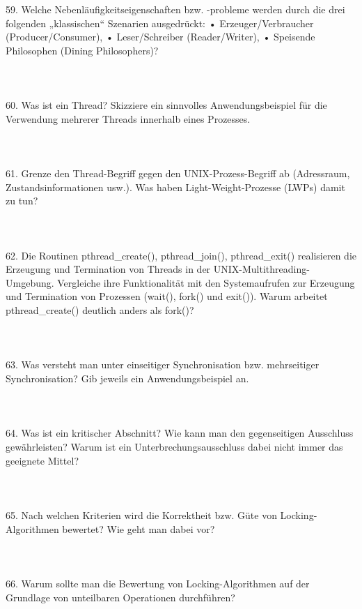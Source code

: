 \documentclass{article}
\begin{document}
59. Welche Nebenläufigkeitseigenschaften bzw. -probleme werden durch die drei folgenden
„klassischen“ Szenarien ausgedrückt:
• Erzeuger/Verbraucher (Producer/Consumer),
• Leser/Schreiber (Reader/Writer),
• Speisende Philosophen (Dining Philosophers)?
\\
\\
\\
\\
60. Was ist ein Thread? Skizziere ein sinnvolles Anwendungsbeispiel für die Verwendung
mehrerer Threads innerhalb eines Prozesses.
\\
\\
\\
\\
61. Grenze den Thread-Begriff gegen den UNIX-Prozess-Begriff ab (Adressraum, Zustandsinformationen usw.). Was haben Light-Weight-Prozesse (LWPs) damit zu tun?
\\
\\
\\
\\
62. Die Routinen pthread_create(), pthread_join(), pthread_exit() realisieren die Erzeugung und Termination von Threads in der UNIX-Multithreading-Umgebung. Vergleiche
ihre Funktionalität mit den Systemaufrufen zur Erzeugung und Termination von Prozessen
(wait(), fork() und exit()). Warum arbeitet pthread_create() deutlich anders als
fork()?
\\
\\
\\
\\
63. Was versteht man unter einseitiger Synchronisation bzw. mehrseitiger Synchronisation?
Gib jeweils ein Anwendungsbeispiel an.
\\
\\
\\
\\
64. Was ist ein kritischer Abschnitt? Wie kann man den gegenseitigen Ausschluss gewährleisten?
Warum ist ein Unterbrechungsausschluss dabei nicht immer das geeignete Mittel?
\\
\\
\\
\\
65. Nach welchen Kriterien wird die Korrektheit bzw. Güte von Locking-Algorithmen bewertet?
Wie geht man dabei vor?
\\
\\
\\
\\
66. Warum sollte man die Bewertung von Locking-Algorithmen auf der Grundlage von unteilbaren Operationen durchführen?
\end{document}
